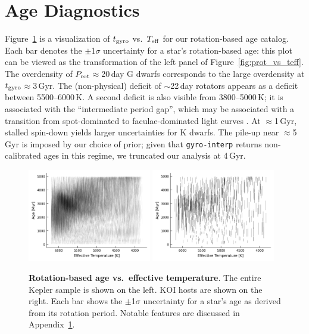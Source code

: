 \documentclass[11pt,twocolumn,tighten]{aastex63}
\begin{document}
\section{Age Diagnostics}
\label{app:age_diagnostic}

Figure~\ref{fig:gyroage_vs_teff} is a visualization of $t_{\rm gyro}$
vs.~$T_{\rm eff}$ for our rotation-based age catalog. 
Each bar denotes the $\pm$1$\sigma$ uncertainty for a star's
rotation-based age:
this plot can be viewed as the transformation of
the left panel of Figure~\ref{fig:prot_vs_teff}.
The overdensity of $P_{\rm rot}$$\approx$20\,day G dwarfs corresponds
to the large overdensity at $t_{\rm gyro}$$\approx$3\,Gyr.
The (non-physical) deficit of $\sim$22\,day rotators appears as a
deficit between 5500--6000\,K.
A second deficit is also visible from 3800--5000\,K;
it is associated with the ``intermediate period gap'', which may be
associated with a transition from spot-dominated to faculae-dominated
light curves \citep[e.g.][]{Reinhold2019}.
At $\approx$1\,Gyr, stalled spin-down yields larger uncertainties for
K dwarfs.
The pile-up near $\approx$5\,Gyr is imposed by our choice of prior;
given that \texttt{gyro-interp} returns non-calibrated ages in this
regime, we truncated our analysis at 4\,Gyr.

\begin{figure}[!t]
  \begin{center}
    \leavevmode
        \includegraphics[width=0.48\textwidth]{gyroage_vs_teff_errs_linear.png}
    \includegraphics[width=0.48\textwidth]{gyroage_vs_teff_errs_showplanets_linear.png}
  \end{center}
  \vspace{-0.6cm}
  \caption{
    {\bf Rotation-based age vs.~effective temperature}.
    The entire Kepler sample is shown on the left.
    KOI hosts are shown on the right.
    Each bar shows the $\pm$1$\sigma$ uncertainty for a star's age as
    derived from its rotation period.  
    Notable features are discussed in
    Appendix~\ref{app:age_diagnostic}.
    \label{fig:gyroage_vs_teff}
  }
\end{figure}
\end{document}
